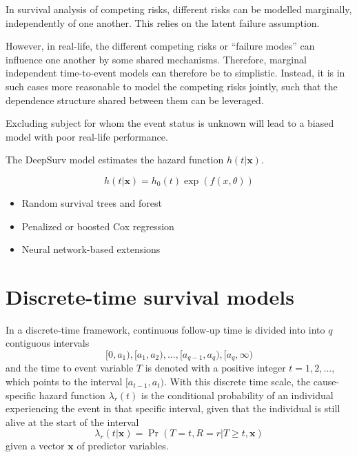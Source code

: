 In survival analysis of competing risks, 
different risks can be modelled marginally,
independently of one another.
This relies on the latent failure assumption.

However, in real-life, the different competing risks 
or \enquote{failure modes} can influence one another
by some shared mechanisms.
Therefore, marginal independent time-to-event models
can therefore be to simplistic.
Instead, it is in such cases
more reasonable to model the competing risks jointly,
such that the dependence structure shared between them
can be leveraged.

Excluding subject for whom the event status is unknown
will lead to a biased model with poor real-life performance.

The DeepSurv model estimates the hazard function \(h(t|\mathbf{x})\).

\begin{equation}
    h(t | \mathbf{x}) = h_0(t) \exp(f(x, \theta))
\end{equation}

\begin{itemize}
    \item Random survival trees and forest
    \item Penalized or boosted Cox regression
    \item Neural network-based extensions
\end{itemize}


\section{Discrete-time survival models}

In a discrete-time framework, 
continuous follow-up time is divided into into \(q\) contiguous intervals
%
\begin{equation*}
	[0, a_1), [a_1, a_2), ..., [a_{q-1}, a_q), [a_{q}, \infty)
\end{equation*}
%
and the time to event variable \(T\) is denoted 
with a positive integer \(t = 1, 2, ...\),
which points to the interval \([a_{t-1}, a_{t})\).
With this discrete time scale,
the cause-specific hazard function \(\lambda_{r}(t)\) is 
the conditional probability of an individual experiencing 
the event in that specific interval,
given that the individual is still alive at the start of the interval
%
\begin{equation*}
    \lambda_{r}(t | \mathbf{x}) = \Pr (T = t, R = r | T \geq t, \mathbf{x})
\end{equation*}
%
given a vector \(\mathbf{x}\) of predictor variables. 

